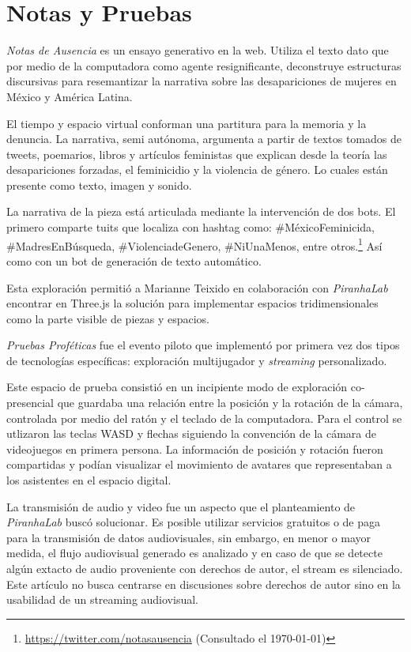 
\section*{Notas y Pruebas} %


\textit{Notas de Ausencia} \citep{notasdeausencia} es un ensayo generativo en la web. Utiliza el texto dato que por medio de la computadora como agente resignificante, deconstruye estructuras discursivas para resemantizar la narrativa sobre las desapariciones de mujeres en México y América Latina.

El tiempo y espacio virtual conforman una partitura para la memoria y la denuncia. La narrativa, semi autónoma, argumenta a partir de textos tomados de tweets, poemarios, libros y artículos feministas que explican desde la teoría las desapariciones forzadas, el feminicidio y la violencia de género. Lo cuales están presente como texto, imagen y sonido.

La narrativa de la pieza está articulada mediante la intervención de dos bots. El primero comparte tuits que localiza con hashtag como: \#MéxicoFeminicida, \#MadresEnBúsqueda, \#ViolenciadeGenero, \#NiUnaMenos, entre otros.\footnote{\url{https://twitter.com/notasausencia} (Consultado el \today)} Así como con un bot de generación de texto automático.

Esta exploración permitió a Marianne Teixido en colaboración con \textit{PiranhaLab} encontrar en Three.js la solución para implementar espacios tridimensionales como la parte visible de piezas y espacios.  

\textit{Pruebas Proféticas} fue el evento piloto que implementó por primera vez dos tipos de tecnologías específicas: exploración multijugador y \textit{streaming} personalizado.

Este espacio de prueba consistió en un incipiente modo de exploración co-presencial que guardaba una relación entre la posición y la rotación de la cámara, controlada por medio del ratón y el teclado de la computadora. Para el control se utlizaron las teclas WASD y flechas siguiendo la convención de la cámara de videojuegos en primera persona. La información de posición y rotación fueron compartidas y podían visualizar el movimiento de avatares que representaban a los asistentes en el espacio digital. 

La transmisión de audio y video fue un aspecto que el planteamiento de \textit{PiranhaLab} buscó solucionar. Es posible utilizar servicios gratuitos o de paga para la transmisión de datos audiovisuales, sin embargo, en menor o mayor medida, el flujo audiovisual generado es analizado y en caso de que se detecte algún extacto de audio proveniente con derechos de autor, el stream es silenciado. Este artículo no busca centrarse en discusiones sobre derechos de autor sino en la usabilidad de un streaming audiovisual. 

